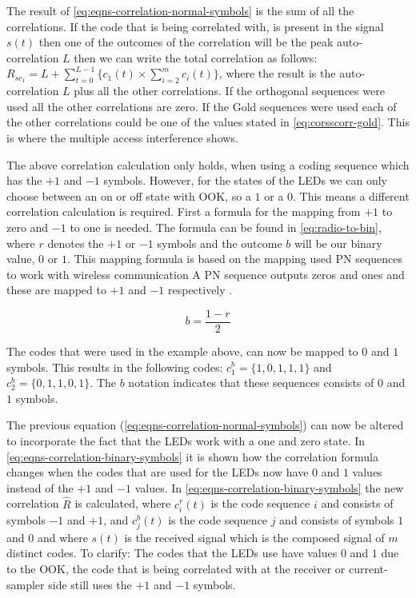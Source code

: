 The result of \autoref{eq:eqns-correlation-normal-symbols} is the sum of all the correlations. 
If the code that is being correlated with, is present in the signal $s(t)$ then one of the outcomes of the correlation will be the peak auto-correlation $L$ then we can write the total correlation as follows: $R_{sc_{1}} = L + \displaystyle\sum_{t = 0} ^ {L - 1} \Bigg\{ c_1(t) \times  \displaystyle\sum_{i = 2} ^ {m} c_i(t) \Bigg\} $, where the result is the auto-correlation $L$ plus all the other correlations.
If the orthogonal sequences were used all the other correlations are zero.
If the Gold sequences were used each of the other correlations could be one of the values stated in \autoref{eq:corsscorr-gold}.
This is where the multiple access interference shows.







The above correlation calculation only holds, when using a coding sequence which has the $+1$ and $-1$ symbols.
However, for the states of the LEDs we can only choose between an on or off state with OOK, so a $1$ or a $0$.
This means a different correlation calculation is required.
First a formula for the mapping from $+1$ to zero and $-1$ to one is needed.
The formula can be found in \autoref{eq:radio-to-bin}, where $r$ denotes the $+1$ or $-1$ symbols and the outcome $b$ will be our binary value, $0$ or $1$.
This mapping formula is based on the mapping used PN sequences to work with wireless communication
A PN sequence outputs zeros and ones and these are mapped to $+1$ and $-1$ respectively \cite{cdma-mapping-symbols-ref}.
 
\begin{equation}
	b = \frac{1 - r}{2}
	\label{eq:radio-to-bin}
\end{equation}


The codes that were used in the example above, can now be mapped to $0$ and $1$ symbols.
This results in the following codes: $c^b_1 = \{ 1, 0, 1, 1, 1 \}$ and $c^b_2 = \{ 0, 1, 1, 0, 1 \}$.
The $b$ notation indicates that these sequences consists of $0$ and $1$ symbols.



The previous equation (\autoref{eq:eqns-correlation-normal-symbols}) can now be altered to incorporate the fact that the LEDs work with a one and zero state.
In \autoref{eq:eqns-correlation-binary-symbols} it is shown how the correlation formula changes when the codes that are used for the LEDs now have $0$ and $1$ values instead of the $+1$ and $-1$ values.
In \autoref{eq:eqns-correlation-binary-symbols} the new correlation $\hat{R}$ is calculated, where $c^r_i(t)$ is the code sequence $i$ and consists of symbols $-1$ and $+1$, and $c^b_j(t)$ is the code sequence $j$ and consists of symbols $1$ and $0$ and where $s(t)$ is the received signal which is the composed signal of $m$ distinct codes.
To clarify: The codes that the LEDs use have values $0$ and $1$ due to the OOK, the code that is being correlated with at the receiver or current-sampler side still uses the $+1$ and $-1$ symbols.


